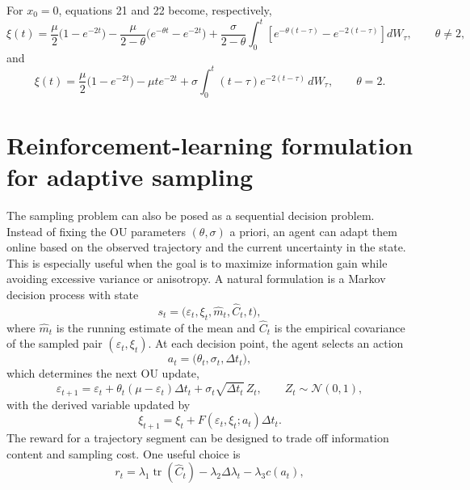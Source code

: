 \documentclass[11pt]{article}
\begin{document}
For $x_0=0$, equations 21 and 22 become, respectively,
\begin{equation}
    \xi(t)=\frac{\mu}{2}\bigl(1-e^{-2t}\bigr)
    -\frac{\mu}{2-\theta}\bigl(e^{-\theta t}-e^{-2t}\bigr)
    +\frac{\sigma}{2-\theta}\int_0^t
    \left[e^{-\theta(t-\tau)}-e^{-2(t-\tau)}\right]dW_\tau,
    \qquad \theta\ne 2,
\end{equation}
and
\begin{equation}
    \xi(t)=\frac{\mu}{2}\bigl(1-e^{-2t}\bigr)
    -\mu t e^{-2t}
    +\sigma\int_0^t (t-\tau)e^{-2(t-\tau)}\,dW_\tau,
    \qquad \theta=2.
\end{equation}

\section{Reinforcement-learning formulation for adaptive sampling}
\label{a:sec:rl-sampling}
The sampling problem can also be posed as a sequential decision problem. Instead of fixing the OU parameters $(\theta,\sigma)$ a priori, an agent can adapt them online based on the observed trajectory and the current uncertainty in the state. This is especially useful when the goal is to maximize information gain while avoiding excessive variance or anisotropy. A natural formulation is a Markov decision process with state
\begin{equation}
    s_t = \bigl(\varepsilon_t,\xi_t,\hat{m}_t,\hat{C}_t, t\bigr),
\end{equation}
where $\hat{m}_t$ is the running estimate of the mean and $\hat{C}_t$ is the empirical covariance of the sampled pair $(\varepsilon_t,\xi_t)$. At each decision point, the agent selects an action
\begin{equation}
    a_t = \bigl(\theta_t,\sigma_t,\Delta t_t\bigr),
\end{equation}
which determines the next OU update,
\begin{equation}
    \varepsilon_{t+1}
    = \varepsilon_t + \theta_t(\mu-\varepsilon_t)\Delta t_t
    + \sigma_t\sqrt{\Delta t_t}\,Z_t,
    \qquad Z_t\sim \mathcal{N}(0,1),
\end{equation}
with the derived variable updated by
\begin{equation}
    \xi_{t+1}=\xi_t + F(\varepsilon_t,\xi_t; a_t)\Delta t_t.
\end{equation}
The reward for a trajectory segment can be designed to trade off information content and sampling cost. One useful choice is
\begin{equation}
    r_t = \lambda_1 \operatorname{tr}(\hat{C}_t)
    - \lambda_2\Delta \lambda_t
    - \lambda_3 c(a_t),
\end{equation}
\end{document}

